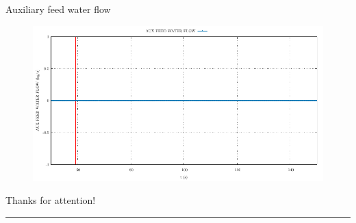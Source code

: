 \begin{frame}{Auxiliary feed water flow}
	\begin{figure}
			\centering
			\includegraphics[width=\textwidth]{./graphs/AUX FEED WATER FLOW_comp.pdf}
			
		\end{figure}
	
\end{frame}

\begin{frame}
\Large{{Thanks for attention!}}
\vspace{0.5cm}
\hrule
\vspace{3cm}
\end{frame}

\nologo



